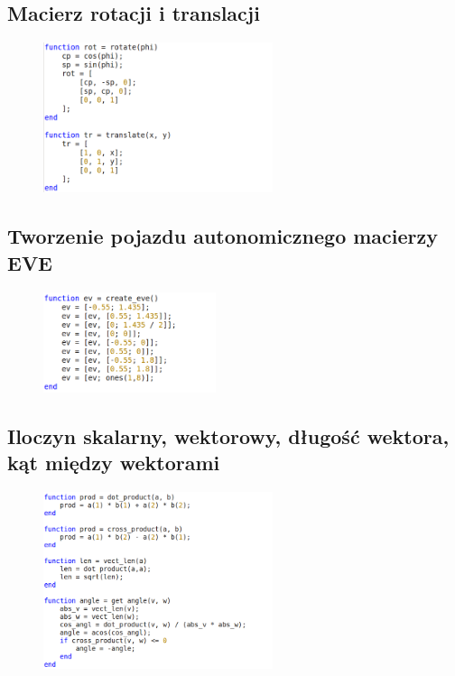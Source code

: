 \documentclass[a4paper, 12pt]{report}
\begin{document}
			\subsection{Macierz rotacji i translacji}
				\begin{figure}[H]
					\includegraphics[width = 0.6\textwidth]{./img/rot_tran.png}
				\end{figure}
			\subsection{Tworzenie pojazdu autonomicznego macierzy EVE}
				\begin{figure}[H]
					\includegraphics[width = 0.45\textwidth]{./img/eve.png}
				\end{figure}
			\subsection{Iloczyn skalarny, wektorowy, długość wektora, kąt między wektorami}
				\begin{figure}[H]
					\includegraphics[width = 0.6\textwidth]{./img/pdla.png}
				\end{figure}
\end{document}
